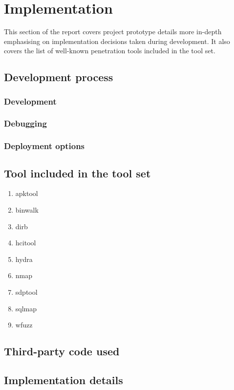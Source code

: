 

\section{Implementation}
This section of the report covers project prototype details more in-depth emphasising on implementation decisions taken during development. It also covers the list of well-known penetration tools included in the tool set.

\subsection{Development process}
\subsubsection{Development}
\subsubsection{Debugging}
\subsubsection{Deployment options}


\subsection{Tool included in the tool set}
	
	\begin{enumerate}
		\item apktool
		\item binwalk
		\item dirb
		\item hcitool
		\item hydra
		\item nmap
		\item sdptool
		\item sqlmap
		\item wfuzz
	\end{enumerate}

\subsection{Third-party code used}

\subsection{Implementation details}


